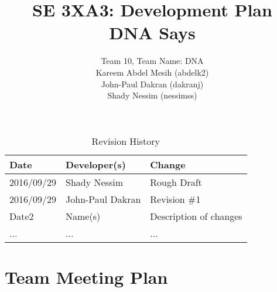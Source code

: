 \documentclass{article}
\title{SE 3XA3: Development Plan\\DNA Says}
\author{Team 10, Team Name: DNA
		\\ Kareem Abdel Mesih (abdelk2)
		\\ John-Paul Dakran (dakranj)
		\\ Shady Nessim (nessimss)
}
\date{}
\begin{document}
\begin{table}[hp]
\caption{Revision History} \label{TblRevisionHistory}
\begin{tabularx}{\textwidth}{llX}
\toprule
\textbf{Date} & \textbf{Developer(s)} & \textbf{Change}\\
\midrule
2016/09/29 & Shady Nessim & Rough Draft\\
2016/09/29 & John-Paul Dakran &  Revision \#1\\
Date2 & Name(s) & Description of changes\\
... & ... & ...\\
\bottomrule
\end{tabularx}
\end{table}
\newpage
\maketitle

\section{Team Meeting Plan}
\end{document}
